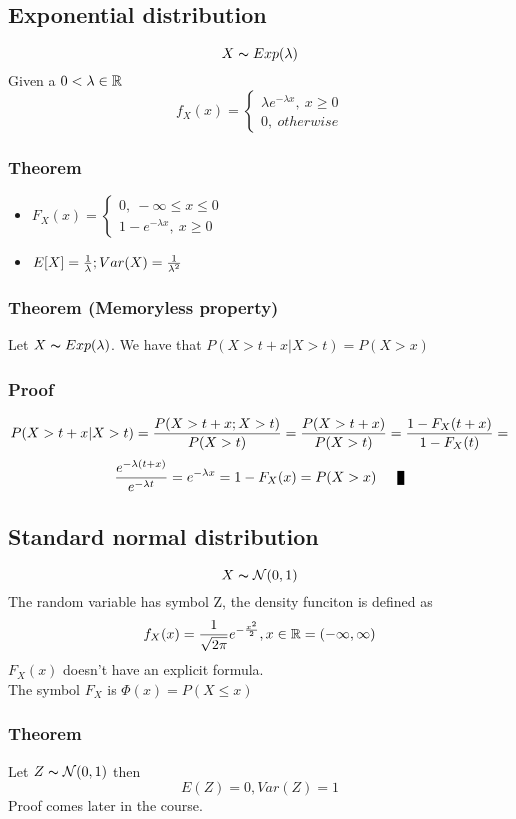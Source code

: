 \documentclass{article}
\newcommand{\N}{{\mathcal{N}}}
\begin{document}
\subsection{Exponential distribution}
$$ X\thicksim Exp(\lambda) $$
Given a $0 < \lambda \in {\mathbb R}$
$$ f_X(x) = \begin{cases}
  \lambda e^{-\lambda x},\ x\ge 0\\
  0,\ otherwise
\end{cases} $$

\subsubsection{Theorem}
\begin{itemize}
    \item $ F_X(x) = \begin{cases} 
      0,\ -\infty\le x\le 0\\
      1-e^{-\lambda x},\ x\ge 0
    \end{cases} $
  \item $ E[X] = \frac{1}{\lambda}; Var(X) = \frac{1}{\lambda^2}$
\end{itemize}

\subsubsection{Theorem (Memoryless property)}
Let $X\thicksim Exp(\lambda)$. We have that $P(X>t+x | X>t) = P(X>x)$
\subsubsection{Proof}
$$P(X>t+x | X>t) = \frac{P(X>t+x ; X>t)}{P(X>t)} = \frac{P(X>t+x)}{P(X>t)} = \frac{1-F_X(t+x)}{1-F_X(t)} =$$
$$\f{e^{-\lambda (t+x)}}{e^{-\lambda t}} = e^{-\lambda x} = 1-F_X(x) = P(X>x) \qed$$

\subsection{Standard normal distribution}
$$ X\thicksim \N(0, 1) $$
The random variable has symbol Z, the density funciton is defined as 
$$ f_X(x) = \frac{1}{\sqrt{2\pi}}e^{-\frac{x^2}{2}}, x\in {\mathbb R} = (-\infty, \infty) $$
$F_X(x)$ doesn't have an explicit formula.\\
The symbol $F_X$ is $\Phi(x) = P(X\le x)$

\subsubsection{Theorem}
Let $ Z\thicksim \N(0, 1) $ then
$$ E(Z) = 0, Var(Z)=1 $$
Proof comes later in the course.
\end{document}
